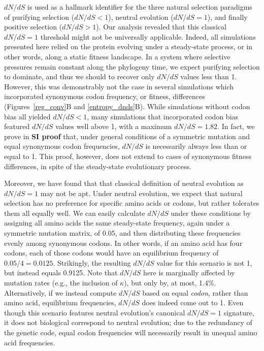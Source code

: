\documentclass[11pt]{article}
\begin{document}
$dN/dS$ is used as a hallmark identifier for the three natural selection paradigms of purifying selection ($dN/dS < 1$), neutral evolution ($dN/dS = 1$), and finally positive selection ($dN/dS > 1$). Our analysis revealed that this classical $dN/dS = 1$ threshold might not be universally applicable. Indeed, all simulations presented here relied on the protein evolving under a steady-state process, or in other words, along a static fitness landscape. In a system where selective pressures remain constant along the phylogeny time, we expect purifying selection to dominate, and thus we should to recover only $dN/dS$ values less than 1. However, this was demonstrably not the case in several simulations which incorporated synonymous codon frequency, or fitness, differences (Figures~\ref{reg_conv}B and \ref{entropy_dnds}B). While simulations without codon bias all yielded $dN/dS < 1$, many simulations that incorporated codon bias featured $dN/dS$ values well above 1, with a maximum $dN/dS = 1.82$. In fact, we prove in \textbf{SI proof} that, under general conditions of a symmetric mutation and equal synonymous codon frequencies, $dN/dS$ is necessarily always less than or equal to 1. This proof, however, does not extend to cases of synonymous fitness differences, in spite of the steady-state evolutionary process. 

Moreover, we have found that that classical definition of neutral evolution as $dN/dS = 1$ may not be apt. Under neutral evolution, we expect that natural selection has no preference for specific amino acids or codons, but rather tolerates them all equally well. We can easily calculate $dN/dS$ under these conditions by assigning all amino acids the same steady-state frequency, again under a symmetric mutation matrix, of 0.05, and then distributing these frequencies evenly among synonymous codons. In other words, if an amino acid has four codons, each of those codons would have an equilibrium frequency of $0.05/4 = 0.0125$. Strikingly, the resulting $dN/dS$ value for this scenario is not 1, but instead equals 0.9125. Note that $dN/dS$ here is marginally affected by mutation rates (e.g., the inclusion of $\kappa$), but only by, at most, 1.4\%. Alternatively, if we instead compute $dN/dS$ based on equal \textit{codon}, rather than amino acid, equilibrium frequencies, $dN/dS$ does indeed come out to 1. Even though this scenario features neutral evolution's canonical $dN/dS=1$ signature, it does not biological correspond to neutral evolution; due to the redundancy of the genetic code, equal codon frequencies will necessarily result in unequal amino acid frequencies.
\end{document}
